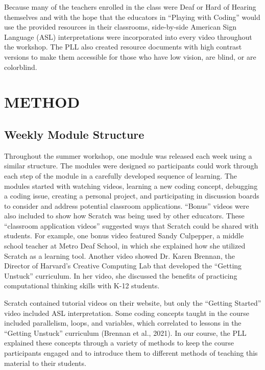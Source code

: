 \documentclass[11.5pt]{sig-alternate} %
\begin{document}
\begin{large}
Because many of the teachers enrolled in the class were Deaf or Hard of Hearing themselves and with the hope that the educators in “Playing with Coding” would use the provided resources in their classrooms, side-by-side American Sign Language (ASL) interpretations were incorporated into every video throughout the workshop. The PLL also created resource documents with high contrast versions to make them accessible for those who have low vision, are blind, or are colorblind.

\section*{METHOD}

\subsection*{Weekly Module Structure}

Throughout the summer workshop, one module was released each week using a similar structure. The modules were designed so participants could work through each step of the module in a carefully developed sequence of learning. The modules started with watching videos, learning a new coding concept, debugging a coding issue, creating a personal project, and participating in discussion boards to consider and address potential classroom applications. “Bonus” videos were also included to show how Scratch was being used by other educators. These “classroom application videos” suggested ways that Scratch could  be shared with students. For example, one bonus video featured Sandy Culpepper, a middle school teacher at Metro Deaf School, in which she explained how she utilized Scratch as a learning tool. Another video showed Dr. Karen Brennan, the Director of Harvard's Creative Computing Lab that developed the “Getting Unstuck” curriculum. In her video, she discussed the benefits of practicing computational thinking skills with K-12 students.

Scratch contained tutorial videos on their website, but only the “Getting Started” video included ASL interpretation. Some coding concepts taught in the course included parallelism, loops, and variables, which correlated to lessons in the “Getting Unstuck” curriculum (Brennan et al., 2021). In our course, the PLL explained these concepts through a variety of methods to keep the course participants engaged and to introduce them to different methods of teaching this material to their students. 


\end{large}
\end{document}
